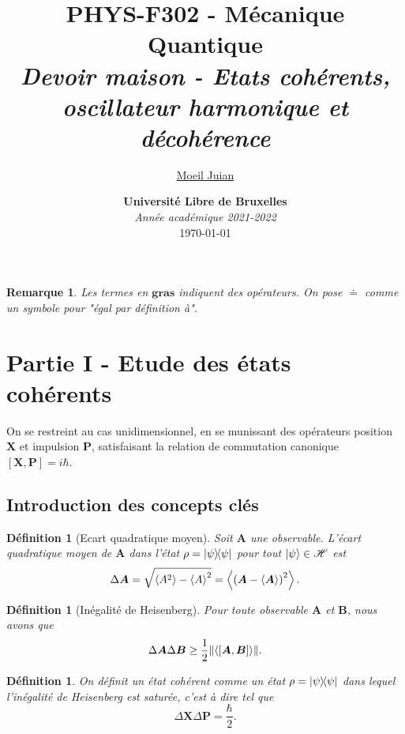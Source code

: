 \documentclass[11pt,oneside,a4paper]{article}
\title{%
  \textbf{PHYS-F302 - Mécanique Quantique} \\
  \textit{Devoir maison - Etats cohérents, oscillateur harmonique et décohérence}
}
\author{%
  \href{mailto:juian.moeil@ulb.be}{Moeil Juian}
}
\date{%
  \textbf{Université Libre de Bruxelles} \\
  \emph{Année académique 2021-2022}\\
  \today
}
\newcommand{\h}{\ensuremath{\hbar}}
\newtheorem{definition}[theorem]{Définition}
\newtheorem{remark}[theorem]{Remarque}
\begin{document}
\maketitle
\thispagestyle{empty}
\tableofcontents
\newpage

\begin{remark}
  Les termes en $\bm{gras}$ indiquent des opérateurs. On pose $\doteq$ comme un symbole pour "égal par définition à".
\end{remark}
\section{Partie I - Etude des états cohérents}
On se restreint au cas unidimensionnel, en se munissant des opérateurs position $\bm{X}$ et impulsion $\bm{P}$, satisfaisant la relation de commutation canonique $[\bm{X},\bm{P}] = i\h$.

\subsection*{Introduction des concepts clés}
\begin{definition}[Ecart quadratique moyen]
  Soit $\bm{A}$ une observable. L'écart quadratique moyen de $\bm{A}$ dans l'état $\rho = \ketbra{\psi}$ pour tout $\ket{\psi}\in\mathcal{H}$ est 
  \begin{equation}
    \label{ecart quadratique moyen}
    \Delta\bm{A} = \sqrt{\expval{A^2}-\expval{A}^2} = \expval{\left(\bm{A}-\expval{\bm{A}}\right)^2}.
  \end{equation}
\end{definition}

\begin{definition}[Inégalité de Heisenberg]
  Pour toute observable $\bm{A}$ et $\bm{B}$, nous avons que
  \begin{equation}
    \label{Heisenberg inequality}
    \Delta\bm{A}\Delta\bm{B}\geq\frac{1}{2}\norm{\expval{[\bm{A},\bm{B}]}}.
  \end{equation}
\end{definition}

\begin{definition}
  \label{def etat coherent saturation}
    On définit un état cohérent comme un état $\rho = \ketbra{\psi}$ dans lequel l'inégalité de Heisenberg est saturée, c'est à dire tel que
    \begin{equation}
      \Delta\bm{X}\Delta\bm{P} = \frac{\h}{2}.
    \end{equation} 
\end{definition}
\end{document}
